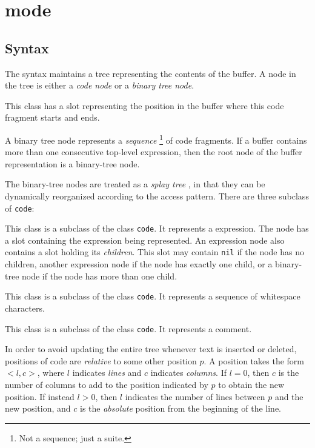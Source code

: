 \chapter{\commonlisp{} mode}
\label{chap-internals-common-lisp-mode}

\section{Syntax}

The \commonlisp{} syntax maintains a tree representing the contents of
the buffer.  A node in the tree is either a \emph{code node} or
a \emph{binary tree node}.


This class has a slot representing the position in the buffer where
this code fragment starts and ends.


A binary tree node represents a \emph{sequence}%
\footnote{Not a \commonlisp{} sequence; just a suite.}  of code
fragments.  If a buffer contains more than one consecutive top-level
expression, then the root node of the buffer representation is a
binary-tree node.

The binary-tree nodes are treated as a \emph{splay tree}
\cite{Sleator:1985:SBS:3828.3835}, in that they can be dynamically
reorganized according to the access pattern.
There are three subclass of \texttt{code}:


This class is a subclass of the class \texttt{code}.  It represents a
\commonlisp{} expression.  The node has a slot containing the
expression being represented.  An expression node also
contains a slot holding its \emph{children}.  This slot may contain
\texttt{nil} if the node has no children, another expression node if
the node has exactly one child, or a binary-tree node if the node has
more than one child.


This class is a subclass of the class \texttt{code}.  It represents a
sequence of whitespace characters.


This class is a subclass of the class \texttt{code}.  It represents a
\commonlisp{} comment.

In order to avoid updating the entire tree whenever text is inserted
or deleted, positions of code are \emph{relative} to some other
position $p$.  A position takes the form $<l,c>$, where $l$ indicates
\emph{lines} and $c$ indicates \emph{columns}.  If $l = 0$, then $c$
is the number of columns to add to the position indicated by $p$ to
obtain the new position.  If instead $l > 0$, then $l$ indicates the
number of lines between $p$ and the new position, and $c$ is the
\emph{absolute} position from the beginning of the line.


